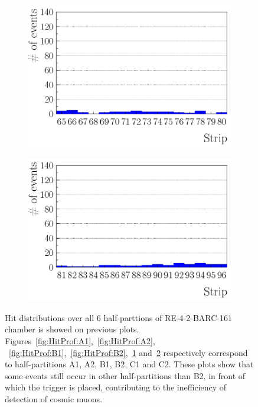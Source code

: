 \begin{figure}[!h]
\begin{subfigure}{0.5\linewidth}
\begin{center}
					\includegraphics[width = 0.5\plotwidth]{fig/C1.pdf}
					\caption{\label{fig:HitProf:C1}}
				\end{center}
			\end{subfigure}
			\begin{subfigure}{0.5\linewidth}
				\begin{center}
					\includegraphics[width = 0.5\plotwidth]{fig/C2.pdf}\\
					\caption{\label{fig:HitProf:C2}}
				\end{center}
			\end{subfigure}
			\caption{\label{fig:HitProf} Hit distributions over all 6 half-parttions of RE-4-2-BARC-161 chamber is showed on previous plots. Figures~\ref{fig:HitProf:A1},~\ref{fig:HitProf:A2}, ~\ref{fig:HitProf:B1},~\ref{fig:HitProf:B2},~\ref{fig:HitProf:C1} and~\ref{fig:HitProf:C2} respectively correspond to half-partitions A1, A2, B1, B2, C1 and C2. These plots show that some events still occur in other half-partitions than B2, in front of which the trigger is placed, contributing to the inefficiency of detection of cosmic muons.}
		\end{figure}
		
